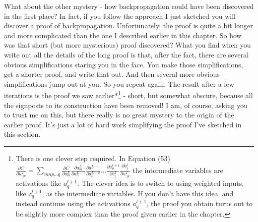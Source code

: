 What about the other mystery - how backpropagation could have been discovered in the first place? In fact, if you follow the approach I just sketched you will discover a proof of backpropagation. Unfortunately, the proof is quite a bit longer and more complicated than the one I described earlier in this chapter. So how was that short (but more mysterious) proof discovered? What you find when you write out all the details of the long proof is that, after the fact, there are several obvious simplifications staring you in the face. You make those simplifications, get a shorter proof, and write that out. And then several more obvious simplifications jump out at you. So you repeat again. The result after a few iterations is the proof we saw earlier*\footnote{There is one clever step required. In Equation (53)$\frac{\partial C}{\partial w^l_{jk}} = \sum_{mnp\ldots q} \frac{\partial C}{\partial a^L_m} \frac{\partial a^L_m}{\partial a^{L-1}_n} \frac{\partial a^{L-1}_n}{\partial a^{L-2}_p} \ldots \frac{\partial a^{l+1}_q}{\partial a^l_j} \frac{\partial a^l_j}{\partial w^l_{jk}}$ the intermediate variables are activations like $a_q^{l+1}$. The clever idea is to switch to using weighted inputs, like $z^{l+1}_q$, as the intermediate variables. If you don't have this idea, and instead continue using the activations $a^{l+1}_q$, the proof you obtain turns out to be slightly more complex than the proof given earlier in the chapter.} - short, but somewhat obscure, because all the signposts to its construction have been removed! I am, of course, asking you to trust me on this, but there really is no great mystery to the origin of the earlier proof. It's just a lot of hard work simplifying the proof I've sketched in this section.
